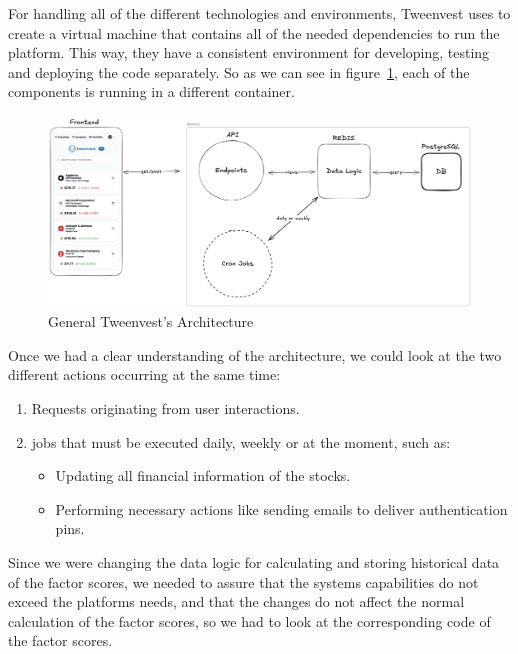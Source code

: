 \documentclass[11pt,english,a4paper,hidelinks]{book}
\begin{document}
\vspace{0.5cm}
\noindent For handling all of the different technologies and environments, Tweenvest uses \textbf{\textcite{dockercompose2025}} to create a virtual machine that contains all of the needed dependencies to run the platform. This way, they have a consistent environment for developing, testing and deploying the code separately. So as we can see in figure~\ref{fig:general_architecture}, each of the components is running in a different container.

\begin{figure}[H]
    \centering
    \includegraphics[width=1\textwidth]{images/tweenvest/general architecture.png}
    \caption{General Tweenvest's Architecture}
    \label{fig:general_architecture}
\end{figure}

\noindent Once we had a clear understanding of the architecture, we could look at the two different actions occurring at the same time: 
\begin{enumerate}
    \item Requests originating from user interactions.
    \item \acrshort{job}s that must be executed daily, weekly or at the moment, such as:
    \begin{itemize}
        \item Updating all financial information of the stocks.
        \item Performing necessary actions like sending emails to deliver authentication pins.
    \end{itemize}
\end{enumerate}

\noindent Since we were changing the data logic for calculating and storing historical data of the factor scores, we needed to assure that the systems capabilities do not exceed the platforms needs, and that the changes do not affect the normal calculation of the factor scores, so we had to look at the corresponding code of the factor scores.
\end{document}
